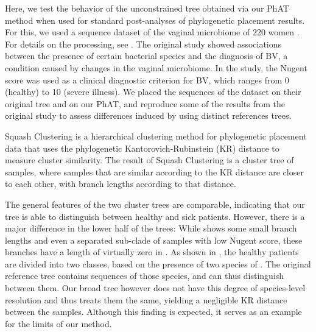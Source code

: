 Here, we test the behavior of the unconstrained  tree obtained via our \ac{PhAT} method
when used for standard post-analyses of phylogenetic placement results.
For this, we used a sequence dataset of the vaginal microbiome of 220 women \citep{Srinivasan2012}.
For details on the processing, see .
The original study showed associations between the presence of certain bacterial species
and the diagnosis of \acf{BV}, a condition caused by changes in the vaginal microbiome.
In the study, the Nugent score \citep{Nugent1991} was used as a clinical diagnostic criterion for \ac{BV},
which ranges from \num{0} (healthy) to \num{10} (severe illness).
We placed the sequences of the dataset on their original tree and on our \ac{PhAT},
and reproduce some of the results from the original study
to assess differences induced by using distinct references trees.

        Squash Clustering is a hierarchical clustering method for phylogenetic placement data \citep{Matsen2011a} %
        that uses the phylogenetic Kantorovich-Rubinstein (KR) distance \citep{Evans2012} %
        to measure cluster similarity.
        The result of Squash Clustering is a cluster tree of samples,
        where samples that are similar according to the KR distance are closer to each other,
        with branch lengths according to that distance.



The general features of the two cluster trees are comparable,
indicating that our tree is able to distinguish between healthy and sick patients.
However, there is a major difference in the lower half of the trees:
While  shows some small branch lengths and even a separated sub-clade
of samples with low Nugent score,
these branches have a length of virtually zero in .
As shown in \citep{Srinivasan2012}, the healthy patients are divided into two classes,
based on the presence of two species of .
The original reference tree contains sequences of those species, and can thus distinguish between them.
Our broad  tree however
does not have this degree of species-level resolution and thus treats them the same,
yielding a negligible KR distance between the samples.
Although this finding is expected, it serves as an example for the limits of our method.

